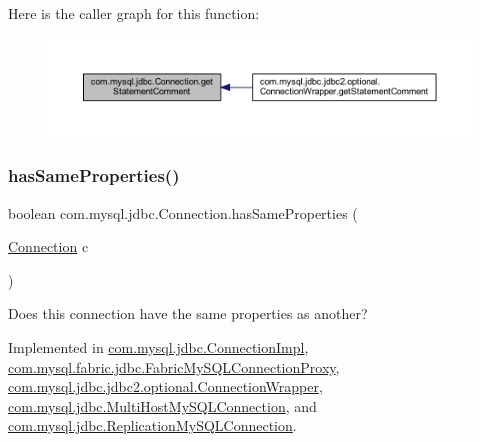 Here is the caller graph for this function\+:\nopagebreak
\begin{figure}[H]
\begin{center}
\leavevmode
\includegraphics[width=350pt]{interfacecom_1_1mysql_1_1jdbc_1_1_connection_a9db688dc671cce2bd98b3f34128981f8_icgraph}
\end{center}
\end{figure}
\mbox{\label{interfacecom_1_1mysql_1_1jdbc_1_1_connection_aa075b035aedfaf2d59114dde53cfc3de}} 
\subsubsection{\texorpdfstring{has\+Same\+Properties()}{hasSameProperties()}}
{\footnotesize\ttfamily boolean com.\+mysql.\+jdbc.\+Connection.\+has\+Same\+Properties (\begin{DoxyParamCaption}\item[{\mbox{\hyperlink{interfacecom_1_1mysql_1_1jdbc_1_1_connection}{Connection}}}]{c }\end{DoxyParamCaption})}

Does this connection have the same properties as another? 

Implemented in \mbox{\hyperlink{classcom_1_1mysql_1_1jdbc_1_1_connection_impl_aa1d8937ef315e396f9acfbeea1ff8c8f}{com.\+mysql.\+jdbc.\+Connection\+Impl}}, \mbox{\hyperlink{classcom_1_1mysql_1_1fabric_1_1jdbc_1_1_fabric_my_s_q_l_connection_proxy_a176ddce1e8bc6a3427fd82582b53e296}{com.\+mysql.\+fabric.\+jdbc.\+Fabric\+My\+S\+Q\+L\+Connection\+Proxy}}, \mbox{\hyperlink{classcom_1_1mysql_1_1jdbc_1_1jdbc2_1_1optional_1_1_connection_wrapper_a374522991d8d1ed955de5defd526a59d}{com.\+mysql.\+jdbc.\+jdbc2.\+optional.\+Connection\+Wrapper}}, \mbox{\hyperlink{classcom_1_1mysql_1_1jdbc_1_1_multi_host_my_s_q_l_connection_a6d1ba78a6ad110ec1027fa341ceef1e5}{com.\+mysql.\+jdbc.\+Multi\+Host\+My\+S\+Q\+L\+Connection}}, and \mbox{\hyperlink{classcom_1_1mysql_1_1jdbc_1_1_replication_my_s_q_l_connection_a6add28fadea7fd82449464de48062955}{com.\+mysql.\+jdbc.\+Replication\+My\+S\+Q\+L\+Connection}}.

